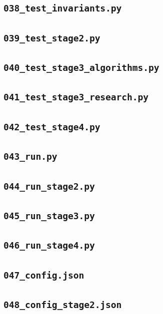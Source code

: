 \subsection*{\texttt{038\_test\_invariants.py}}

\subsection*{\texttt{039\_test\_stage2.py}}

\subsection*{\texttt{040\_test\_stage3\_algorithms.py}}

\subsection*{\texttt{041\_test\_stage3\_research.py}}

\subsection*{\texttt{042\_test\_stage4.py}}

\subsection*{\texttt{043\_run.py}}

\subsection*{\texttt{044\_run\_stage2.py}}

\subsection*{\texttt{045\_run\_stage3.py}}

\subsection*{\texttt{046\_run\_stage4.py}}

\subsection*{\texttt{047\_config.json}}

\subsection*{\texttt{048\_config\_stage2.json}}

